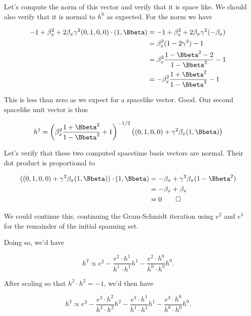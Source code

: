 Let's compute the norm of this vector and verify that it is space like.  We should also verify that it is normal to $h^0$ as expected.  For the norm we have

\begin{align*}
-1 + \beta_x^2 + 2 \beta_x \gamma^2 (0, 1, 0, 0) \cdot (1, \Bbeta)
&=
-1 + \beta_x^2 + 2 \beta_x \gamma^2 (-\beta_x) \\
&=
\beta_x^2 ( 1 - 2 \gamma^2 ) -1 \\
&=
\beta_x^2 \frac{1 - \Bbeta^2 - 2 }{1 - \Bbeta^2} -1 \\
&=
-\beta_x^2 \frac{1 + \Bbeta^2}{1 - \Bbeta^2} -1 \\
\end{align*}

This is less than zero as we expect for a spacelike vector.  Good.  Our second spacelike unit vector is thus

\begin{equation}\label{eqn:relativisticElectrodynamicsT2:760}
h^1 = \left( \beta_x^2 \frac{1 + \Bbeta^2}{1 - \Bbeta^2} +1 \right)^{-1/2} \left( 
(0, 1, 0, 0) + \gamma^2 \beta_x (1, \Bbeta)
\right)
\end{equation}

Let's verify that these two computed spacetime basis vectors are normal.  Their dot product is proportional to 

\begin{align*}
((0, 1, 0, 0) + \gamma^2 \beta_x (1, \Bbeta)) \cdot (1, \Bbeta) 
&= -\beta_x + \gamma^2 \beta_x ( 1 - \Bbeta^2 ) \\
&= -\beta_x + \beta_x \\
&= 0 \qquad \square
\end{align*}

We could continue this, continuing the Gram-Schmidt iteration using $e^2$ and $e^3$ for the remainder of the initial spanning set.

Doing so, we'd have

\begin{equation}\label{eqn:relativisticElectrodynamicsT2:770}
h^2 \propto e^2 - \frac{e^2 \cdot h^1}{h^1 \cdot h^1} h^1 - \frac{e^2 \cdot h^0}{h^0 \cdot h^0} h^0.
\end{equation}

After scaling so that $h^2 \cdot h^2 = -1$, we'd then have

\begin{equation}\label{eqn:relativisticElectrodynamicsT2:780a}
h^3 \propto 
e^3 
- \frac{e^3 \cdot h^2}{h^2 \cdot h^2} h^2 
- \frac{e^3 \cdot h^1}{h^1 \cdot h^1} h^1 
- \frac{e^3 \cdot h^0}{h^0 \cdot h^0} h^0.
\end{equation}

